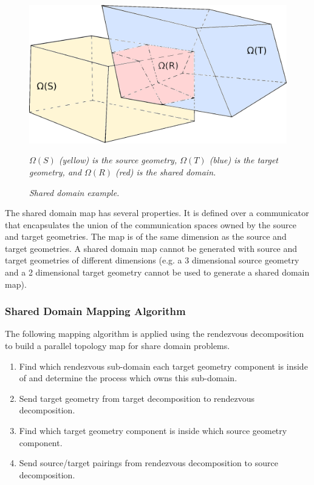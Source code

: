 \documentclass[letterpaper,12pt]{article}
\begin{document}
\begin{figure}[htpb!]
  \centering
  \includegraphics[width=5in]{overlapping_domain.eps}
  \caption{\sl Shared domain example.} {\sl $\Omega(S)$ (yellow)
    is the source geometry, $\Omega(T)$ (blue) is the target geometry,
    and $\Omega(R)$ (red) is the shared domain.}
  \label{fig:shared_domain}
\end{figure}

The shared domain map has several properties. It is defined over a
communicator that encapsulates the union of the communication spaces
owned by the source and target geometries.  The map is of the same
dimension as the source and target geometries. A shared domain map
cannot be generated with source and target geometries of different
dimensions (e.g. a 3 dimensional source geometry and a 2 dimensional
target geometry cannot be used to generate a shared domain map).

\subsubsection{Shared Domain Mapping Algorithm}
\label{subsubsec:shared_domain_alg}
The following mapping algorithm is applied using the rendezvous
decomposition to build a parallel topology map for share domain
problems.

\begin{enumerate}
\item Find which rendezvous sub-domain each target geometry component
  is inside of and determine the process which owns this sub-domain.
\item Send target geometry from target decomposition to rendezvous
  decomposition.
\item Find which target geometry component is inside which source
  geometry component.
\item Send source/target pairings from rendezvous decomposition to
  source decomposition.
\end{enumerate}
\end{document}
